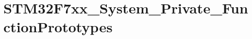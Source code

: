 \hypertarget{group___s_t_m32_f7xx___system___private___function_prototypes}{}\section{S\+T\+M32\+F7xx\+\_\+\+System\+\_\+\+Private\+\_\+\+Function\+Prototypes}
\label{group___s_t_m32_f7xx___system___private___function_prototypes}
